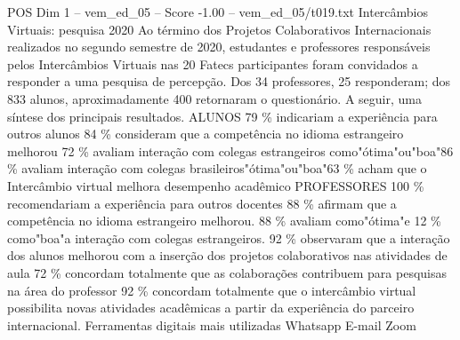 \begin{textsample}{POS Dim 1 – vem\_ed\_05 – Score -1.00 – vem\_ed\_05/t019.txt}  \label{ex:f1_pos_085}
Intercâmbios Virtuais: pesquisa 2020 Ao término dos Projetos Colaborativos Internacionais realizados no segundo semestre de 2020, estudantes e professores responsáveis pelos Intercâmbios Virtuais nas 20 Fatecs participantes foram convidados a responder a uma pesquisa de percepção.
Dos 34 professores, 25 responderam; dos 833 alunos, aproximadamente 400 retornaram o questionário.
A seguir, uma síntese dos principais resultados.
ALUNOS 79 \% indicariam a experiência para outros alunos 84 \% consideram que a competência no idioma estrangeiro melhorou 72 \% avaliam interação com colegas estrangeiros como"ótima"ou"boa"86 \% avaliam interação com colegas brasileiros"ótima"ou"boa"63 \% acham que o Intercâmbio virtual melhora desempenho acadêmico PROFESSORES 100 \% recomendariam a experiência para outros docentes 88 \% afirmam que a competência no idioma estrangeiro melhorou. 88 \% avaliam como"ótima"e 12 \% como"boa"a interação com colegas estrangeiros. 92 \% observaram que a interação dos alunos melhorou com a inserção dos projetos colaborativos nas atividades de aula 72 \% concordam totalmente que as colaborações contribuem para pesquisas na área do professor 92 \% concordam totalmente que o intercâmbio virtual possibilita novas atividades acadêmicas a partir da experiência do parceiro internacional.
Ferramentas digitais mais utilizadas Whatsapp E-mail Zoom

\end{textsample}
